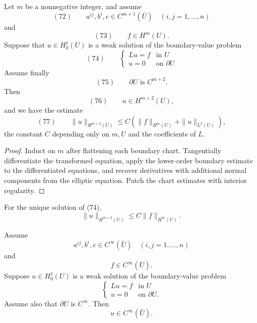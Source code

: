 \begin{theorem}
\label{thm:higher-boundary-regularity}
Let $m$ be a nonnegative integer, and assume
$$(72) \qquad a^{ij}, b^i, c \in C^{m+1}(\bar U) \quad (i,j=1,\ldots,n)$$
and
$$(73) \qquad f \in H^m(U).$$
Suppose that $u \in H_0^1(U)$ is a weak solution of the boundary-value problem
$$(74) \qquad \begin{cases} Lu = f & \text{in } U \\ u = 0 & \text{on } \partial U \end{cases}$$
Assume finally
$$(75) \qquad \partial U \text{ is } C^{m+2}.$$
Then
$$(76) \qquad u \in H^{m+2}(U),$$
and we have the estimate
$$(77) \qquad \|u\|_{H^{m+2}(U)} \leq C(\|f\|_{H^m(U)} + \|u\|_{L^2(U)}),$$
the constant $C$ depending only on $m, U$ and the coefficients of $L$.
\end{theorem}

\begin{proof}
\sketch Induct on $m$ after flattening each boundary chart. Tangentially differentiate the transformed equation, apply the lower-order boundary estimate to the differentiated equations, and recover derivatives with additional normal components from the elliptic equation. Patch the chart estimates with interior regularity.
\end{proof}

\begin{remark}
\label{rem:higher-boundary-regularity-simplified}
For the unique solution of (74),
$$\|u\|_{H^{m+2}(U)} \leq C\|f\|_{H^m(U)}.$$
\end{remark}

\begin{theorem}
\label{thm:boundary-infinite-differentiability}
Assume
$$a^{ij}, b^i, c \in C^\infty(\bar U) \quad (i,j=1,\ldots,n)$$
and
$$f \in C^\infty(\bar U).$$
Suppose $u \in H_0^1(U)$ is a weak solution of the boundary-value problem
$$\begin{cases} Lu = f & \text{in } U \\ u = 0 & \text{on } \partial U. \end{cases}$$
Assume also that $\partial U$ is $C^\infty$. Then
$$u \in C^\infty(\bar U).$$
\end{theorem}

